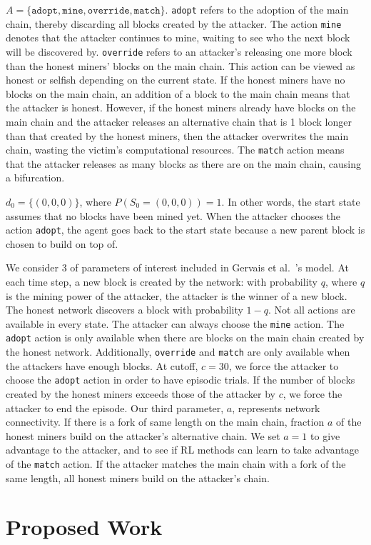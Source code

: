  $A = \{\texttt{adopt}, \texttt{mine}, \texttt{override}, \texttt{match}\}$. \texttt{adopt} refers to the adoption of the main chain, thereby discarding all blocks created by the attacker. The action \texttt{mine} denotes that the attacker continues to mine, waiting to see who the next block will be discovered by. \texttt{override} refers to an attacker's releasing one more block than the honest miners' blocks on the main chain. This action can be viewed as honest or selfish depending on the current state. If the honest miners have no blocks on the main chain, an addition of a block to the main chain means that the attacker is honest. However, if the honest miners already have blocks on the main chain and the attacker releases an alternative chain that is 1 block longer than that created by the honest miners, then the attacker overwrites the main chain, wasting the victim's computational resources. The \texttt{match} action means that the attacker releases as many blocks as there are on the main chain, causing a bifurcation.

 $d_0 = \{(0, 0, 0)\}$, where $P(S_0 = (0, 0, 0)) = 1$. In other words, the start state assumes that no blocks have been mined yet. When the attacker chooses the action  \texttt{adopt}, the agent goes back to the start state because a new parent block is chosen to build on top of.

 We consider 3 of parameters of interest included in Gervais et al.~\cite{Gervais:2016}'s model. At each time step, a new block is created by the network: with probability $q$, where $q$ is the mining power of the attacker, the attacker is the winner of a new block. The honest network discovers a block with probability $1-q$. Not all actions are available in every state. The attacker can always choose the \texttt{mine} action. The \texttt{adopt} action is only available when there are blocks on the main chain created by the honest network. Additionally, \texttt{override} and \texttt{match} are only available when the attackers have enough blocks. At cutoff, $c=30$, we force the attacker to choose the \texttt{adopt} action in order to have episodic trials. If the number of blocks created by the honest miners exceeds those of the attacker by $c$, we force the attacker to end the episode. Our third parameter, $a$, represents network connectivity. If there is a fork of same length on the main chain, fraction $a$ of the honest miners build on the attacker's alternative chain. We set $a=1$ to give advantage to the attacker, and to see if RL methods can learn to take advantage of the \texttt{match} action. If the attacker matches the main chain with a fork of the same length, all honest miners build on the attacker's chain. 

\section{Proposed Work}

